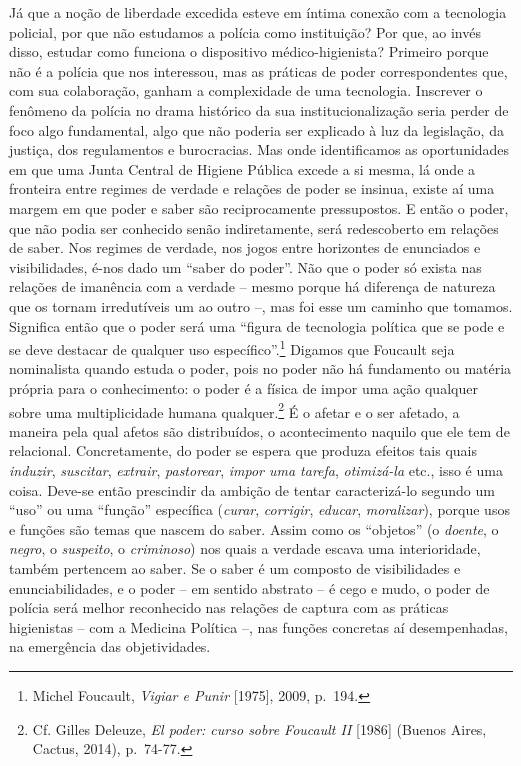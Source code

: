 Já que a noção de liberdade excedida esteve em íntima conexão com a
tecnologia policial, por que não estudamos a polícia como instituição?
Por que, ao invés disso, estudar como funciona o dispositivo
médico-higienista? Primeiro porque não é a polícia que nos interessou,
mas as práticas de poder correspondentes que, com sua colaboração,
ganham a complexidade de uma tecnologia. Inscrever o fenômeno da polícia
no drama histórico da sua institucionalização seria perder de foco algo
fundamental, algo que não poderia ser explicado à luz da legislação, da
justiça, dos regulamentos e burocracias. Mas onde identificamos as
oportunidades em que uma Junta Central de Higiene Pública excede a si
mesma, lá onde a fronteira entre regimes de verdade e relações de poder
se insinua, existe aí uma margem em que poder e saber são reciprocamente
pressupostos. E então o poder, que não podia ser conhecido senão
indiretamente, será redescoberto em relações de saber. Nos regimes de
verdade, nos jogos entre horizontes de enunciados e visibilidades, é-nos
dado um ``saber do poder''. Não que o poder só exista nas relações de
imanência com a verdade -- mesmo porque há diferença de natureza que os
tornam irredutíveis um ao outro --, mas foi esse um caminho que tomamos.
Significa então que o poder será uma ``figura de tecnologia política que
se pode e se deve destacar de qualquer uso específico''.\footnote{Michel
  Foucault, \emph{Vigiar e Punir} {[}1975{]}, 2009, p.~194.} Digamos que
Foucault seja nominalista quando estuda o poder, pois no poder não há
fundamento ou matéria própria para o conhecimento: o poder é a física de
impor uma ação qualquer sobre uma multiplicidade humana
qualquer.\footnote{Cf. Gilles Deleuze, \emph{El poder: curso sobre
  Foucault II} {[}1986{]} (Buenos Aires, Cactus, 2014), p.~74-77.} É o
afetar e o ser afetado, a maneira pela qual afetos são distribuídos, o
acontecimento naquilo que ele tem de relacional. Concretamente, do poder
se espera que produza efeitos tais quais \emph{induzir},
\emph{suscitar}, \emph{extrair}, \emph{pastorear}, \emph{impor uma
tarefa}, \emph{otimizá-la} etc., isso é uma coisa. Deve-se então
prescindir da ambição de tentar caracterizá-lo segundo um ``uso'' ou uma
``função'' específica (\emph{curar}, \emph{corrigir}, \emph{educar},
\emph{moralizar}), porque usos e funções são temas que nascem do saber.
Assim como os ``objetos'' (o \emph{doente}, o \emph{negro}, o
\emph{suspeito}, o \emph{criminoso}) nos quais a verdade escava uma
interioridade, também pertencem ao saber. Se o saber é um composto de
visibilidades e enunciabilidades, e o poder -- em sentido abstrato -- é
cego e mudo, o poder de polícia será melhor reconhecido nas relações de
captura com as práticas higienistas -- com a Medicina Política --, nas
funções concretas aí desempenhadas, na emergência das objetividades.

